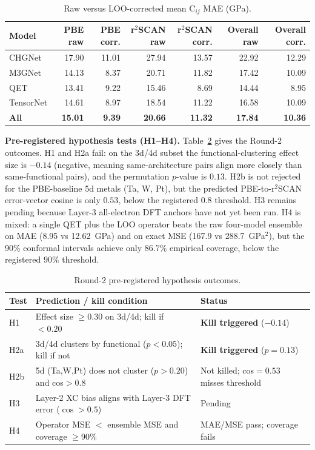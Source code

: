 \documentclass[11pt]{article}
\begin{document}
\begin{table}[h]
\centering
\caption{Raw versus LOO-corrected mean C$_{ij}$ MAE (GPa).}
\label{tab:loo}
\begin{tabular}{lrrrrrr}
\toprule
Model & PBE raw & PBE corr. & r$^2$SCAN raw & r$^2$SCAN corr. & Overall raw & Overall corr. \\
\midrule
CHGNet & 17.90 & 11.01 & 27.94 & 13.57 & 22.92 & 12.29 \\
M3GNet & 14.13 & 8.37 & 20.71 & 11.82 & 17.42 & 10.09 \\
QET & 13.41 & 9.22 & 15.46 & 8.69 & 14.44 & 8.95 \\
TensorNet & 14.61 & 8.97 & 18.54 & 11.22 & 16.58 & 10.09 \\
\textbf{All} & \textbf{15.01} & \textbf{9.39} & \textbf{20.66} & \textbf{11.32} & \textbf{17.84} & \textbf{10.36} \\
\bottomrule
\end{tabular}
\end{table}

\textbf{Pre-registered hypothesis tests (H1--H4).} Table~\ref{tab:h} gives the
Round-2 outcomes. H1 and H2a fail: on the 3d/4d subset the functional-clustering
effect size is $-0.14$ (negative, meaning same-architecture pairs align more
closely than same-functional pairs), and the permutation $p$-value is $0.13$.
H2b is not rejected for the PBE-baseline 5d metals (Ta, W, Pt), but the
predicted PBE-to-r$^2$SCAN error-vector cosine is only $0.53$, below the
registered $0.8$ threshold. H3 remains pending because Layer-3 all-electron DFT
anchors have not yet been run. H4 is mixed: a single QET plus the LOO operator
beats the raw four-model ensemble on MAE (8.95 vs 12.62~GPa) and on exact MSE
(167.9 vs 288.7~GPa$^2$), but the 90\% conformal intervals achieve only
$86.7\%$ empirical coverage, below the registered $90\%$ threshold.

\begin{table}[h]
\centering
\caption{Round-2 pre-registered hypothesis outcomes.}
\label{tab:h}
\begin{tabular}{lp{8cm}l}
\toprule
Test & Prediction / kill condition & Status \\
\midrule
H1 & Effect size $\ge 0.30$ on 3d/4d; kill if $<0.20$ & \textbf{Kill triggered} ($-0.14$) \\
H2a & 3d/4d clusters by functional ($p<0.05$); kill if not & \textbf{Kill triggered} ($p=0.13$) \\
H2b & 5d (Ta,W,Pt) does not cluster ($p>0.20$) and cos$>0.8$ & Not killed; cos$=0.53$ misses threshold \\
H3 & Layer-2 XC bias aligns with Layer-3 DFT error ($\cos>0.5$) & Pending \\
H4 & Operator MSE $<$ ensemble MSE and coverage $\ge90\%$ & MAE/MSE pass; coverage fails \\
\bottomrule
\end{tabular}
\end{table}
\end{document}
